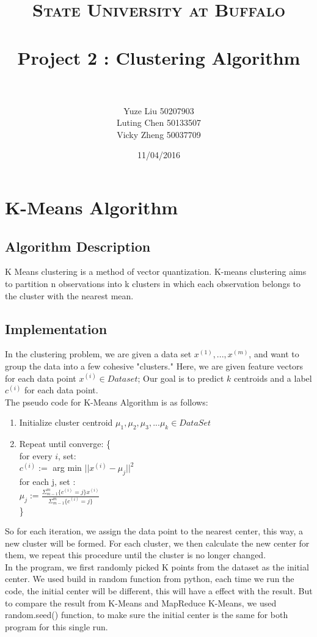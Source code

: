 \documentclass[paper=letter, fontsize=11pt]{article}
\title{
		\usefont{OT1}{bch}{b}{n}
		\normalfont \normalsize \textsc{State University at Buffalo} \\ [25pt]
		\horrule{0.5pt} \\[0.4cm]
		\Large Project 2 : Clustering Algorithm \\
		\horrule{2pt} \\[0.5cm]
}
\author{
		\normalfont\large 								
        Yuze Liu \hspace{0.6cm}50207903\\
        \normalfont\large 
        Luting Chen \hspace{0.5cm}50133507\\
        \normalfont\large 
        Vicky Zheng \hspace{0.5cm}50037709\\
}
\date{\large 11/04/2016}
\numberwithin{equation}{section}		%
\numberwithin{figure}{section}			%
\numberwithin{table}{section}				%
\begin{document}
\maketitle
\section{K-Means Algorithm}
\subsection{Algorithm Description}
K Means clustering is a method of vector quantization. K-means clustering aims to partition n observations into k clusters in which each observation belongs to the cluster with the nearest mean.
\subsection{Implementation}
In the clustering problem, we are given a data set $x^{(1)},...,x^{(m)}$, and want to group the data into a few cohesive "clusters." Here, we are given feature vectors for each data point $x^{(i)} \in Dataset$; Our goal is to predict $k$ centroids and a label $c^{(i)}$ for each data point.\\ 
The pseudo code for K-Means Algorithm is as follows:\\
\begin{enumerate}
	\item Initialize cluster centroid $\mu_1,\mu_2,\mu_3,...\mu_k \in DataSet$
	\item Repeat until converge: \{\\
	      \hspace*{0.5cm}for every $i$, set:\\
	      \hspace*{0.9cm}$c^{(i)} :=$ arg min $||x^{(i)} - \mu_j||^2$\\
	      \hspace*{0.5cm}for each j, set :\\
	      \hspace*{0.9cm}$\mu_j := \frac{\Sigma_{m-1}^{m} \{c^{(i)} = j\}x^{(i)}}{\Sigma_{m-1}^{m}\{c^{(i)} = j\}}$\\
	\}
\end{enumerate}
So for each iteration, we assign the data point to the nearest center, this way, a new cluster will be formed. For each cluster, we then calculate the new center for them, we repeat this procedure until the cluster is no longer changed.\\
In the program, we first randomly picked K points from the dataset as the initial center. We used build in random function from python, each time we run the code, the initial center will be different, this will have a effect with the result. But to compare the result from K-Means and MapReduce K-Means, we used random.seed() function, to make sure the initial center is the same for both program for this single run.\\
\end{document}
